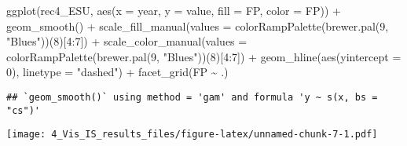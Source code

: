 \documentclass[
]{article}
\newenvironment{Shaded}{\begin{snugshade}}{\end{snugshade}}
\newcommand{\AttributeTok}[1]{\textcolor[rgb]{0.77,0.63,0.00}{#1}}
\newcommand{\DecValTok}[1]{\textcolor[rgb]{0.00,0.00,0.81}{#1}}
\newcommand{\FunctionTok}[1]{\textcolor[rgb]{0.00,0.00,0.00}{#1}}
\newcommand{\NormalTok}[1]{#1}
\newcommand{\SpecialCharTok}[1]{\textcolor[rgb]{0.00,0.00,0.00}{#1}}
\newcommand{\StringTok}[1]{\textcolor[rgb]{0.31,0.60,0.02}{#1}}
\begin{document}
\begin{Shaded}
\begin{Highlighting}[]
\FunctionTok{ggplot}\NormalTok{(rec4\_ESU, }\FunctionTok{aes}\NormalTok{(}\AttributeTok{x =}\NormalTok{ year, }\AttributeTok{y =}\NormalTok{ value, }\AttributeTok{fill =}\NormalTok{ FP, }\AttributeTok{color =}\NormalTok{ FP)) }\SpecialCharTok{+}
  \FunctionTok{geom\_smooth}\NormalTok{() }\SpecialCharTok{+}
  \FunctionTok{scale\_fill\_manual}\NormalTok{(}\AttributeTok{values =} \FunctionTok{colorRampPalette}\NormalTok{(}\FunctionTok{brewer.pal}\NormalTok{(}\DecValTok{9}\NormalTok{, }\StringTok{"Blues"}\NormalTok{))(}\DecValTok{8}\NormalTok{)[}\DecValTok{4}\SpecialCharTok{:}\DecValTok{7}\NormalTok{]) }\SpecialCharTok{+}
  \FunctionTok{scale\_color\_manual}\NormalTok{(}\AttributeTok{values =} \FunctionTok{colorRampPalette}\NormalTok{(}\FunctionTok{brewer.pal}\NormalTok{(}\DecValTok{9}\NormalTok{, }\StringTok{"Blues"}\NormalTok{))(}\DecValTok{8}\NormalTok{)[}\DecValTok{4}\SpecialCharTok{:}\DecValTok{7}\NormalTok{]) }\SpecialCharTok{+}
    \FunctionTok{geom\_hline}\NormalTok{(}\FunctionTok{aes}\NormalTok{(}\AttributeTok{yintercept =} \DecValTok{0}\NormalTok{),}
             \AttributeTok{linetype =} \StringTok{"dashed"}\NormalTok{) }\SpecialCharTok{+} 
  \FunctionTok{facet\_grid}\NormalTok{(FP }\SpecialCharTok{\textasciitilde{}}\NormalTok{ .)}
\end{Highlighting}
\end{Shaded}

\begin{verbatim}
## `geom_smooth()` using method = 'gam' and formula 'y ~ s(x, bs = "cs")'
\end{verbatim}

\texttt{[image: 4\_Vis\_IS\_results\_files/figure-latex/unnamed-chunk-7-1.pdf]}
\end{document}
